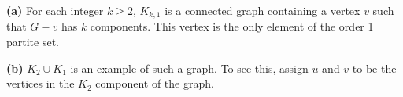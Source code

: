 \documentclass[12pt]{article}
\begin{document}
\newpage{}

    {\bf (a)} For each integer $k \geq 2$, $K_{k,1}$ is a connected graph containing a vertex $v$ such that $G-v$ has $k$ components.
    This vertex is the only element of the order 1 partite set.

    {\bf (b)} $K_2 \cup K_1$ is an example of such a graph.
    To see this, assign $u$ and $v$ to be the vertices in the $K_2$ component of the graph.

\newpage{}

    
\end{document}
